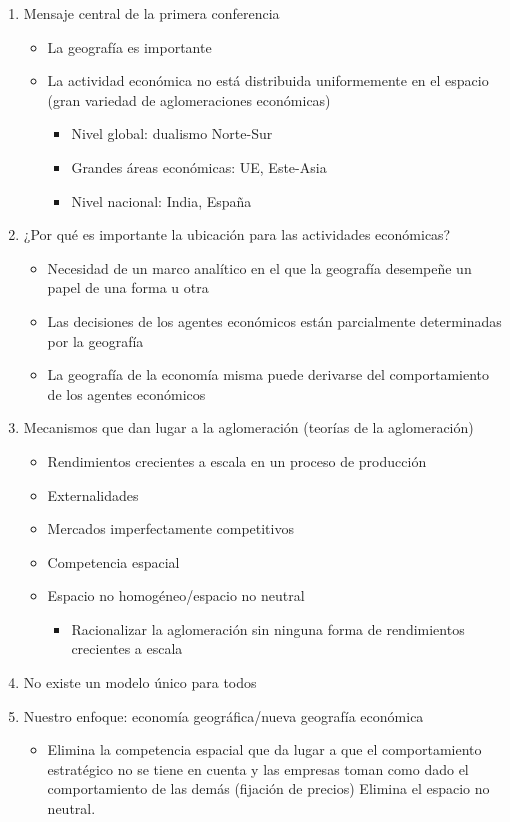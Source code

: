 \begin{enumerate}
    \item Mensaje central de la primera conferencia
	\begin{itemize}
	    \item La geografía es importante
	    \item La actividad económica no está distribuida uniformemente en el espacio (gran variedad de aglomeraciones económicas)
	    \begin{itemize}
		\item Nivel global: dualismo Norte-Sur 
		\item Grandes áreas económicas: UE, Este-Asia 
		\item Nivel nacional: India, España
	    \end{itemize}
	\end{itemize}
    \item ¿Por qué es importante la ubicación para las actividades económicas?
	\begin{itemize}
	    \item Necesidad de un marco analítico en el que la geografía desempeñe un papel de una forma u otra 
	    \item Las decisiones de los agentes económicos están parcialmente determinadas por la geografía 
	    \item La geografía de la economía misma puede derivarse del comportamiento de los agentes económicos
	\end{itemize}
    \item Mecanismos que dan lugar a la aglomeración (teorías de la aglomeración)
	\begin{itemize}
	    \item Rendimientos crecientes a escala en un proceso de producción
	    \item Externalidades
	    \item Mercados imperfectamente competitivos
	    \item Competencia espacial
	    \item Espacio no homogéneo/espacio no neutral
		\begin{itemize}
		    \item Racionalizar la aglomeración sin ninguna forma de rendimientos crecientes a escala
		\end{itemize}
	\end{itemize}
    \item No existe un modelo único para todos 
    \item Nuestro enfoque: economía geográfica/nueva geografía económica
	\begin{itemize}
	    \item Elimina la competencia espacial que da lugar a que el comportamiento estratégico no se tiene en cuenta y las empresas toman como dado el comportamiento de las demás (fijación de precios) Elimina el espacio no neutral.
	\end{itemize}
	    
\end{enumerate}

